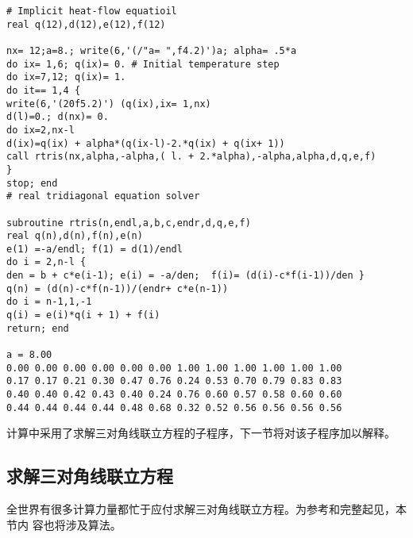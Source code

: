\begin{verbatim}
# Implicit heat-flow equatioil
real q(12),d(12),e(12),f(12)

nx= 12;a=8.; write(6,'(/"a= ",f4.2)')a; alpha= .5*a
do ix= 1,6; q(ix)= 0. # Initial temperature step
do ix=7,12; q(ix)= 1.
do it== 1,4 {
write(6,'(20f5.2)') (q(ix),ix= 1,nx)
d(l)=0.; d(nx)= 0.
do ix=2,nx-l
d(ix)=q(ix) + alpha*(q(ix-l)-2.*q(ix) + q(ix+ 1))
call rtris(nx,alpha,-alpha,( l. + 2.*alpha),-alpha,alpha,d,q,e,f)
}
stop; end
# real tridiagonal equation solver

subroutine rtris(n,endl,a,b,c,endr,d,q,e,f)
real q(n),d(n),f(n),e(n)
e(1) =-a/endl; f(1) = d(1)/endl
do i = 2,n-l {
den = b + c*e(i-1); e(i) = -a/den;  f(i)= (d(i)-c*f(i-1))/den }
q(n) = (d(n)-c*f(n-1))/(endr+ c*e(n-1))
do i = n-1,1,-1
q(i) = e(i)*q(i + 1) + f(i)
return; end

a = 8.00
0.00 0.00 0.00 0.00 0.00 0.00 1.00 1.00 1.00 1.00 1.00 1.00
0.17 0.17 0.21 0.30 0.47 0.76 0.24 0.53 0.70 0.79 0.83 0.83
0.40 0.40 0.42 0.43 0.40 0.24 0.76 0.60 0.57 0.58 0.60 0.60
0.44 0.44 0.44 0.44 0.48 0.68 0.32 0.52 0.56 0.56 0.56 0.56
\end{verbatim}
计算中采用了求解三对角线联立方程的子程序，下一节将对该子程序加以解释。

\subsection{求解三对角线联立方程}
\label{sec:2.2.7}

全世界有很多计算力量都忙于应付求解三对角线联立方程。为参考和完整起见，本节内
容也将涉及算法。

